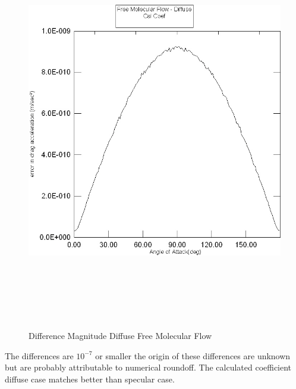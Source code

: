 \begin{description}
\begin{figure}[hbpt]
\includegraphics [height=175mm]{figs/diffuse_cc_err.jpg}
\caption{Difference Magnitude Diffuse Free Molecular Flow}
\label{fig:8}
\end{figure}
The differences are $10^{-7}$ or smaller the origin of these differences
are unknown but are probably attributable to numerical roundoff.  The
calculated coefficient diffuse case matches better than specular case.
\end{description}

